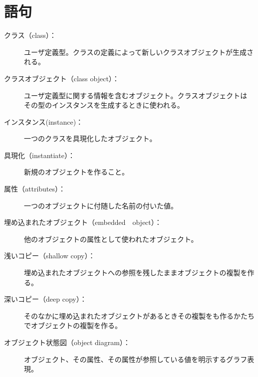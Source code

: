 \documentclass[a4j,12pt,makeidx]{jbook}
\begin{document}
\section{語句}
\begin{description}

\item[クラス（class）：] ユーザ定義型。クラスの定義によって新しいクラスオブジェクトが生成される。

\item[クラスオブジェクト（class object）：] ユーザ定義型に関する情報を含むオブジェクト。クラスオブジェクトは
その型のインスタンスを生成するときに使われる。

\item[インスタンス(instance)：] 一つのクラスを具現化したオブジェクト。

\item[具現化（instantiate）：] 新規のオブジェクトを作ること。

\item[属性（attributes）：] 一つのオブジェクトに付随した名前の付いた値。

\item[埋め込まれたオブジェクト（embedded　object）：] 他のオブジェクトの属性として使われたオブジェクト。

\item[浅いコピー（shallow copy）：] 埋め込まれたオブジェクトへの参照を残したままオブジェクトの複製を作る。

\item[深いコピー（deep copy）：] そのなかに埋め込まれたオブジェクトがあるときその複製をも作るかたちでオブジェクトの複製を作る。

\item[オブジェクト状態図（object diagram）：] オブジェクト、その属性、その属性が参照している値を明示するグラフ表現。

\end{description}
%
\end{document}
